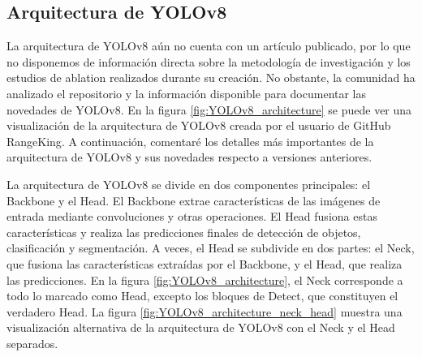 \subsection{Arquitectura de YOLOv8}
La arquitectura de YOLOv8 aún no cuenta con un artículo publicado, por lo que no disponemos de información directa sobre la metodología de investigación y los estudios de ablation realizados durante su creación. No obstante, la comunidad ha analizado el repositorio y la información disponible para documentar las novedades de YOLOv8. En la figura \ref{fig:YOLOv8_architecture} se puede ver una visualización de la arquitectura de YOLOv8 creada por el usuario de GitHub RangeKing\cite{RangeKing_GitHub}. A continuación, comentaré los detalles más importantes de la arquitectura de YOLOv8 y sus novedades respecto a versiones anteriores. \cite{whats-new-in-yolov8} \cite{yolov8-architecture-blog} \cite{yolov8-architecture-blog2}

La arquitectura de YOLOv8 se divide en dos componentes principales: el Backbone y el Head. El Backbone extrae características de las imágenes de entrada mediante convoluciones y otras operaciones. El Head fusiona estas características y realiza las predicciones finales de detección de objetos, clasificación y segmentación. A veces, el Head se subdivide en dos partes: el Neck, que fusiona las características extraídas por el Backbone, y el Head, que realiza las predicciones. En la figura \ref{fig:YOLOv8_architecture}, el Neck corresponde a todo lo marcado como Head, excepto los bloques de Detect, que constituyen el verdadero Head. La figura \ref{fig:YOLOv8_architecture_neck_head} muestra una visualización alternativa de la arquitectura de YOLOv8 con el Neck y el Head separados.


